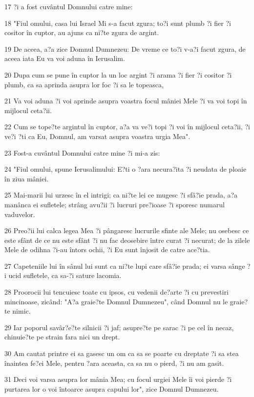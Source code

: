 \par 17 ?i a fost cuvântul Domnului catre mine:
\par 18 "Fiul omului, casa lui Israel Mi s-a facut zgura; to?i sunt plumb ?i fier ?i cositor în cuptor, au ajuns ca ni?te zgura de argint.
\par 19 De aceea, a?a zice Domnul Dumnezeu: De vreme ce to?i v-a?i facut zgura, de aceea iata Eu va voi aduna în Ierusalim.
\par 20 Dupa cum se pune în cuptor la un loc argint ?i arama ?i fier ?i cositor ?i plumb, ca sa aprinda asupra lor foc ?i sa le topeasca,
\par 21 Va voi aduna ?i voi aprinde asupra voastra focul mâniei Mele ?i va voi topi în mijlocul ceta?ii.
\par 22 Cum se tope?te argintul în cuptor, a?a va ve?i topi ?i voi în mijlocul ceta?ii, ?i ve?i ?ti ca Eu, Domnul, am varsat asupra voastra urgia Mea".
\par 23 Fost-a cuvântul Domnului catre mine ?i mi-a zis:
\par 24 "Fiul omului, spune Ierusalimului: E?ti o ?ara necura?ita ?i neudata de ploaie în ziua mâniei.
\par 25 Mai-marii lui urzesc în el intrigi; ca ni?te lei ce mugesc ?i sfâ?ie prada, a?a manânca ei sufletele; strâng avu?ii ?i lucruri pre?ioase ?i sporesc numarul vaduvelor.
\par 26 Preo?ii lui calca legea Mea ?i pângaresc lucrurile sfinte ale Mele; nu osebesc ce este sfânt de ce nu este sfânt ?i nu fac deosebire între curat ?i necurat; de la zilele Mele de odihna ?i-au întors ochii, ?i Eu sunt înjosit de catre ace?tia.
\par 27 Capeteniile lui în sânul lui sunt ca ni?te lupi care sfâ?ie prada; ei varsa sânge ?i ucid sufletele, ca sa-?i sature lacomia.
\par 28 Proorocii lui tencuiesc toate cu ipsos, cu vedenii de?arte ?i cu prevestiri mincinoase, zicând: "A?a graie?te Domnul Dumnezeu", când Domnul nu le graie?te nimic.
\par 29 Iar poporul savâr?e?te silnicii ?i jaf; asupre?te pe sarac ?i pe cel în necaz, chinuie?te pe strain fara nici un drept.
\par 30 Am cautat printre ei sa gasesc un om ca sa se poarte cu dreptate ?i sa stea înaintea fe?ei Mele, pentru ?ara aceasta, ca sa nu o pierd, ?i nu am gasit.
\par 31 Deci voi varsa asupra lor mânia Mea; cu focul urgiei Mele îi voi pierde ?i purtarea lor o voi întoarce asupra capului lor", zice Domnul Dumnezeu.

